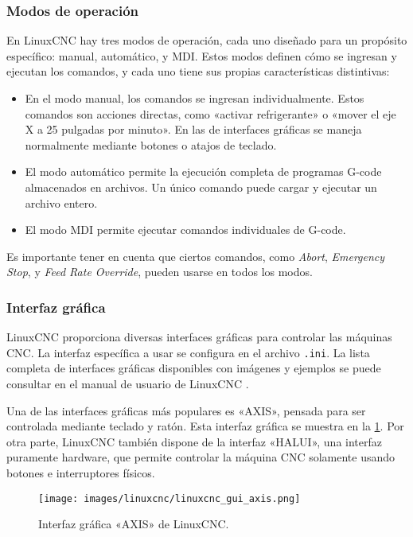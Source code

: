 \documentclass[english,spanish,a4paper,11pt]{article}
\begin{document}
\subsubsection{Modos de operación}
\label{sec:linuxcnc_modes_of_operation}

En LinuxCNC hay tres modos de operación, cada uno diseñado para un propósito específico: manual, automático, y \ac{MDI}. Estos modos definen cómo se ingresan y ejecutan los comandos, y cada uno tiene sus propias características distintivas:
%
\begin{itemize}
    \item En el modo manual, los comandos se ingresan individualmente. Estos comandos son acciones directas, como «activar refrigerante» o «mover el eje X a 25 pulgadas por minuto». En las de interfaces gráficas se maneja normalmente mediante botones o atajos de teclado.

    \item El modo automático permite la ejecución completa de programas G-code almacenados en archivos. Un único comando puede cargar y ejecutar un archivo entero.

    \item El modo \ac{MDI} permite ejecutar comandos individuales de G-code.
\end{itemize}

Es importante tener en cuenta que ciertos comandos, como \textit{Abort}, \textit{Emergency Stop}, y \textit{Feed Rate Override}, pueden usarse en todos los modos. 


\subsubsection{Interfaz gráfica}

LinuxCNC proporciona diversas interfaces gráficas para controlar las máquinas \ac{CNC}. La interfaz específica a usar se configura en el archivo \texttt{.ini}. La lista completa de interfaces gráficas disponibles con imágenes y ejemplos se puede consultar en el manual de usuario de LinuxCNC \cite{linuxcncdoc}.

Una de las interfaces gráficas más populares es «AXIS», pensada para ser controlada mediante teclado y ratón. Esta interfaz gráfica se muestra en la \cref{fig:linuxcnc_gui_axis_estop}. Por otra parte, LinuxCNC también dispone de la interfaz «HALUI», una interfaz puramente hardware, que permite controlar la máquina \ac{CNC} solamente usando botones e interruptores físicos.
%
\begin{figure}[!ht]
    \centering
    \texttt{[image: images/linuxcnc/linuxcnc\_gui\_axis.png]}
    \caption{Interfaz gráfica «AXIS» de LinuxCNC.}
    \label{fig:linuxcnc_gui_axis_estop}
\end{figure}
\end{document}
